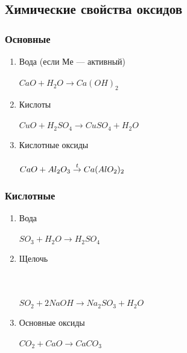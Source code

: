 \subsection{Химические свойства оксидов}
\subsubsection{Основные}
\begin{enumerate}
    \item Вода (если $Ме$ --- активный)\\
        \\
        $CaO + H_2O \rightarrow Ca(OH)_2$

    \item Кислоты\\
        \\
        $CuO + H_2SO_4 \rightarrow CuSO_4 + H_2O$

    \item Кислотные оксиды\\
        \\
        $CaO + Al_2O_3 \stackrel{t}{\rightarrow} Ca(AlO_2)_2$

\end{enumerate}


\subsubsection{Кислотные}
\begin{enumerate}
    \item Вода\\
        \\
        $SO_3 + H_2O \rightarrow H_2SO_4$

    \item Щелочь\\
        \\
        \\
        \\
        $SO_2 + 2NaOH \rightarrow Na_2SO_3 + H_2O$

    \item Основные оксиды\\
        \\
        $CO_2 + CaO \rightarrow CaCO_3$
\end{enumerate}
